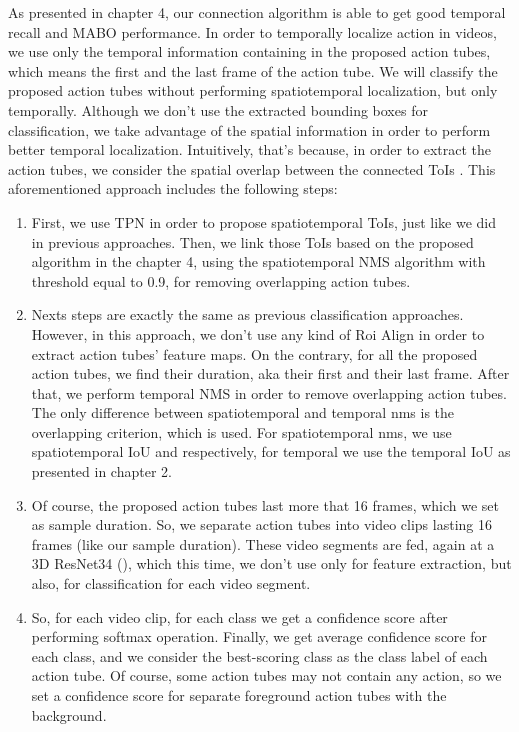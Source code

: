 As presented in chapter 4, our connection algorithm is able to get good temporal recall and MABO performance. 
In order to temporally localize action in videos, we use only the temporal information containing in the proposed action tubes, which means the first and the last frame of the action tube.
We will classify the proposed action tubes without performing spatiotemporal localization, but only temporally. Although we don't use the extracted bounding boxes for classification,
we take advantage of the spatial information in order to perform better temporal localization. Intuitively, that's because, in order to extract the action tubes, we consider the spatial overlap
between the connected ToIs . This aforementioned approach includes the following steps:
\begin{enumerate}
\item First, we use TPN in order to propose  spatiotemporal ToIs, just like we did in previous approaches. Then, we link those ToIs based
  on the proposed algorithm in the chapter 4, using the spatiotemporal NMS algorithm with threshold equal to 0.9, for removing overlapping action tubes.
\item Nexts steps are exactly the same as previous classification approaches. However, in this approach, we don't use any kind of Roi Align
  in order to extract action tubes' feature maps. On the contrary, for all the proposed action tubes, we find their duration, aka their first
  and their last frame. After that, we perform temporal NMS in order to remove overlapping action tubes. The only difference between
  spatiotemporal and temporal nms is the overlapping criterion, which is used. For spatiotemporal nms, we use spatiotemporal IoU and
  respectively, for temporal we use the temporal IoU as presented in chapter 2.
\item Of course, the proposed action tubes last more that 16 frames, which we set as sample duration. So, we separate action tubes into
  video clips lasting 16 frames (like our sample duration). These video segments are fed, again at a 3D ResNet34 (\cite{hara3dcnns}), which
   this time, we don't use  only for feature extraction, but also, for classification for each video segment.
\item So, for each video clip, for each class we get a confidence score after performing softmax operation. Finally, we get
  average confidence score for each class, and we consider the best-scoring class as the class label of each action tube.
  Of course, some action tubes may not contain any action, so we set a confidence score for separate foreground action tubes with the
  background.
\end{enumerate}

